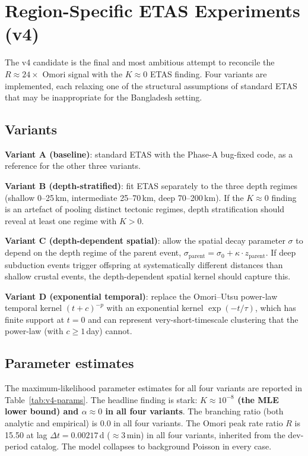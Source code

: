 \documentclass[10pt,a4paper,twocolumn]{article}
\begin{document}
\section{Region-Specific ETAS Experiments (v4)}\label{sec:region-specific}

The v4 candidate is the final and most ambitious attempt to reconcile the $R\approx24\times$ Omori signal with the $K\approx0$ ETAS finding. Four variants are implemented, each relaxing one of the structural assumptions of standard ETAS that may be inappropriate for the Bangladesh setting.

\subsection{Variants}

\textbf{Variant A (baseline)}: standard ETAS with the Phase-A bug-fixed code, as a reference for the other three variants.

\textbf{Variant B (depth-stratified)}: fit ETAS separately to the three depth regimes (shallow 0--25\,km, intermediate 25--70\,km, deep 70--200\,km). If the $K\approx0$ finding is an artefact of pooling distinct tectonic regimes, depth stratification should reveal at least one regime with $K>0$.

\textbf{Variant C (depth-dependent spatial)}: allow the spatial decay parameter $\sigma$ to depend on the depth regime of the parent event, $\sigma_{\text{parent}} = \sigma_0 + \kappa \cdot z_{\text{parent}}$. If deep subduction events trigger offspring at systematically different distances than shallow crustal events, the depth-dependent spatial kernel should capture this.

\textbf{Variant D (exponential temporal)}: replace the Omori--Utsu power-law temporal kernel $(t+c)^{-p}$ with an exponential kernel $\exp(-t/\tau)$, which has finite support at $t=0$ and can represent very-short-timescale clustering that the power-law (with $c\geq1$\,day) cannot.

\subsection{Parameter estimates}

The maximum-likelihood parameter estimates for all four variants are reported in Table~\ref{tab:v4-params}. The headline finding is stark: \textbf{$K\approx10^{-8}$ (the MLE lower bound) and $\alpha\approx0$ in all four variants}. The branching ratio (both analytic and empirical) is 0.0 in all four variants. The Omori peak rate ratio $R$ is 15.50 at lag $\Delta t = 0.00217$\,d ($\approx3$\,min) in all four variants, inherited from the dev-period catalog. The model collapses to background Poisson in every case.
\end{document}
